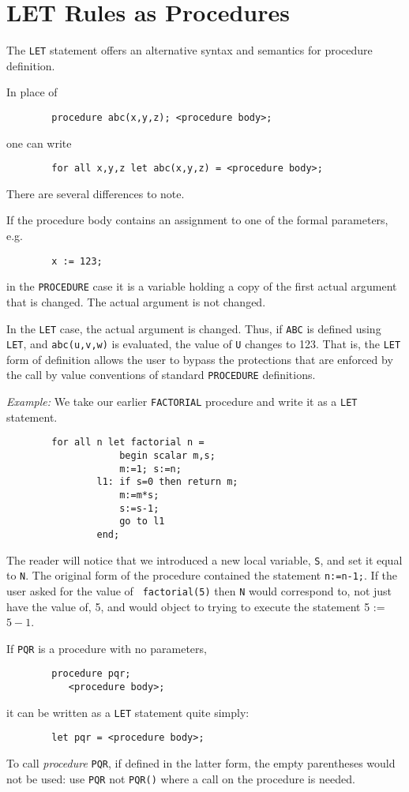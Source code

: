 \section{LET Rules as Procedures}

The {\tt LET} statement offers an alternative syntax and
semantics for procedure definition.

In place of
\begin{verbatim}
        procedure abc(x,y,z); <procedure body>;
\end{verbatim}
one can write
\begin{verbatim}
        for all x,y,z let abc(x,y,z) = <procedure body>;
\end{verbatim}
There are several differences to note.

If the procedure body contains an assignment to one of the formal
parameters, e.g.
\begin{verbatim}
        x := 123;
\end{verbatim}
in the {\tt PROCEDURE} case it is a variable holding a copy of the first
actual argument that is changed.  The actual argument is not changed.

In the {\tt LET} case, the actual argument is changed.  Thus, if {\tt ABC}
is defined using {\tt LET}, and {\tt abc(u,v,w)} is evaluated, the value
of {\tt U} changes to 123.  That is, the {\tt LET} form of definition
allows the user to bypass the protections that are enforced by the call
by value conventions of standard {\tt PROCEDURE} definitions.

{\it Example:}  We take our earlier {\tt FACTORIAL}
procedure and write it as a {\tt LET} statement.
\begin{verbatim}
        for all n let factorial n =
                    begin scalar m,s;
                    m:=1; s:=n;
                l1: if s=0 then return m;
                    m:=m*s;
                    s:=s-1;
                    go to l1
                end;
\end{verbatim}
The reader will notice that we introduced a new local variable, {\tt S},
and set it equal to {\tt N}.  The original form of the procedure contained
the statement {\tt n:=n-1;}.  If the user asked for the value of {\tt
factorial(5)} then {\tt N} would correspond to, not just have the value
of, 5, and {\REDUCE} would object to trying to execute the statement
5 := $5-1$.

If {\tt PQR} is a procedure with no parameters,
\begin{verbatim}
        procedure pqr;
           <procedure body>;
\end{verbatim}
it can be written as a {\tt LET} statement quite simply:
\begin{verbatim}
        let pqr = <procedure body>;
\end{verbatim}
To call {\em procedure\/} {\tt PQR}, if defined in the latter form, the empty
parentheses would not be used: use {\tt PQR} not {\tt PQR()} where a call
on the procedure is needed.

